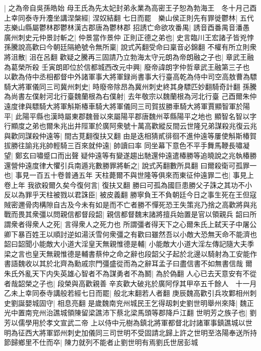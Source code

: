 |{
	之為帝自吳孫皓始}
母王氏為先太妃封弟永業為高密王子恕為勃海王　冬十月己酉上幸同泰寺升灋坐講涅槃經|{
	涅奴結翻}
七日而罷　樂山侯正則先有罪徙鬱林|{
	五代志樂山縣屬鬱林郡鬱林漢古郡唐為鬱林郡}
招誘亡命欲攻番禺|{
	誘音酉番禺音潘愚}
廣州刺史元仲景討斬之|{
	仲景當作景仲}
正則正德之弟也|{
	史言臨川王宏諸子皆兇悖}
孫騰說高歡曰今朝廷隔絶號令無所稟|{
	說式芮翻受命曰稟音必錦翻}
不權有所立則衆將沮散|{
	沮在呂翻}
歡疑之騰再三固請乃立勃海太守元朗為帝朗融之子也|{
	章武王融為葛榮所殺}
壬寅朗即位於信都城西改元中興|{
	廢帝諱朗字仲哲章武王融第三子也}
以歡為侍中丞相都督中外諸軍事大將軍録尚書事大行臺高乾為侍中司空高敖曹為驃騎大將軍儀同三司冀州刺史|{
	時廢帝除昂為冀州刺史終其身驃匹妙翻騎奇計翻}
孫騰為尚書左僕射河北行臺魏蘭根為右僕射|{
	去年敬宗以魏蘭根為河北行臺}
己酉爾朱仲遠度律與驃騎大將軍斛斯椿車騎大將軍儀同三司賀拔勝車騎大將軍賈顯智軍於陽平|{
	此陽平縣也漢時屬東郡魏晉以來屬陽平郡唐魏州莘縣陽平之地也}
顯智名智以字行顯度之弟也爾朱兆出井陘軍於廣阿衆號十萬高歡縱反間云世隆兄弟謀殺兆復云兆與歡同謀殺仲遠等|{
	間古莧翻復扶又翻}
由是迭相猜貳徘徊不進仲遠等屢使斛斯椿賀拔勝往諭兆兆帥輕騎三百來就仲遠|{
	帥讀曰率}
同坐幕下意色不平手舞馬鞭長嘯凝望|{
	鄭玄曰嘯蹙口而出聲}
疑仲遠等有變遂趨出馳還仲遠遣椿勝等追曉說之兆執椿勝還營仲遠度律大懼引兵南遁兆數勝罪將斬之|{
	說式芮翻數所具翻}
曰爾殺衛可孤罪一也|{
	事見一百五十卷普通五年}
天柱薨爾不與世隆等俱來而東征仲遠罪二也|{
	事見上卷上年}
我欲殺爾久矣今復何言|{
	復扶又翻}
勝曰可孤為國巨患勝父子誅之其功不小反以為罪乎天柱被戮以君誅臣|{
	被皮義翻}
勝寧負王不負朝廷今日之事生死在王但寇賊密邇骨肉構隙自古及今未有如是而不亡者勝不憚死恐王失策兆乃捨之高歡將與兆戰而畏其衆彊以問親信都督段韶|{
	親信都督魏末諸將擅兵始置是官以領親兵}
韶曰所謂衆者得衆人之死|{
	言得衆人之死力也}
所謂彊者得天下之心爾朱氏上弑天子中屠公卿下暴百姓王以順討逆如湯沃雪何衆彊之有歡曰雖然吾以小敵大恐無天命不能濟也韶曰韶聞小能敵大小道大淫皇天無親惟德是輔|{
	小能敵大小道大淫左傳記隨大夫季梁之言也皇天無親惟德是輔書蔡仲之命之辭也段韶父子起於北邊以騎射為工安能作書語魏收以其於北齊為勳戚宗門彊盛從而為之辭耳孟子曰盡信書不如無書信哉}
爾朱氏外亂天下内失英雄心智者不為謀勇者不為鬭|{
	為於偽翻}
人心已去天意安有不從者哉韶榮之子也|{
	段榮與高歡親善}
辛亥歡大破兆於廣阿俘其甲卒五千餘人　十一月乙未上幸同泰寺講般若經七日而罷|{
	般北末翻若人者翻}
庚辰魏高歡引兵攻鄴相州刺史劉誕嬰城固守|{
	相息亮翻}
是歲魏南兖州城民王乞得刼刺史劉世明舉州來降|{
	魏正光中置南兖州治譙城領陳留梁譙沛下蔡北梁馬頭等郡降戶江翻}
世明芳之族子也|{
	劉芳以儒學用於孝文宣武二帝}
上以侍中元樹為鎮北將軍都督北討諸軍事鎮譙城以世明為征西大將軍郢州刺史加儀同三司世明不受固請北歸上許之世明至洛陽奉送所持節歸鄉里不仕而卒|{
	陳力就列不能者止劉世明有焉劉氏世居彭城}


